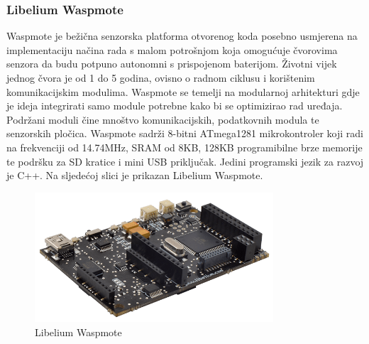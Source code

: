 \documentclass[times, utf8, diplomski]{fer}
\begin{document}
\subsubsection{Libelium Waspmote}
Waspmote\citep{Waspmote} je bežična senzorska platforma otvorenog koda posebno usmjerena na implementaciju načina rada s malom potrošnjom koja omogućuje čvorovima senzora da budu potpuno autonomni s prispojenom baterijom. Životni vijek jednog čvora je od 1 do 5 godina, ovisno o radnom ciklusu i korištenim komunikacijskim modulima. Waspmote se temelji na modularnoj arhitekturi gdje je ideja integrirati samo module potrebne kako bi se optimizirao rad uređaja. Podržani moduli čine mnoštvo komunikacijskih, podatkovnih modula te senzorskih pločica. Waspmote sadrži 8-bitni ATmega1281 mikrokontroler koji radi na frekvenciji od 14.74MHz, SRAM od 8KB, 128KB programibilne brze memorije te podršku za SD kratice i mini USB priključak. Jedini programski jezik za razvoj je C++. Na sljedećoj slici je prikazan Libelium Waspmote.
\begin{figure}[htb]
    \centering
    \includegraphics[width=8.9cm]{images/waspmote.png}
    \caption{Libelium Waspmote\citep{Waspmote}}
    \label{fig:waspmote}
\end{figure}
\end{document}
